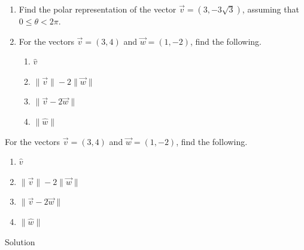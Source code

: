 \begin{example} \label{polarformvecex} 
\ifcourse
\begin{enumerate}
\item  Find the polar representation of the vector $\vec{v} = \left(3, -3\sqrt{3}\right)$, assuming that $0 \leq \theta < 2\pi$.

\item For the vectors $\vec{v} = \left(3,4\right)$ and $\vec{w} = \left(1, -2\right)$, find the following.

\begin{multicols}{4}

\begin{enumerate}

\item  $\hat{v}$

\item  $\| \vec{v} \| -2 \|\vec{w}\|$

\item  $\| \vec{v} -2\vec{w}\|$

\item  $\| \hat{w} \|$ \label{preludetounitvector}

\end{enumerate}

\end{multicols}
\end{enumerate}
\fi

\ifvc
For the vectors $\vec{v} = \left(3,4\right)$ and $\vec{w} = \left(1, -2\right)$, find the following.
	\begin{multicols}{4}	
		\begin{enumerate}
			
			\item  $\hat{v}$
			
			\item  $\| \vec{v} \| -2 \|\vec{w}\|$
			
			\item  $\| \vec{v} -2\vec{w}\|$
			
			\item  $\| \hat{w} \|$ \label{preludetounitvector}
			
		\end{enumerate}	
	\end{multicols}

\fi

\pagebreak
{}Solution 

\ifcourse
\begin{enumerate}


\end{enumerate}
\end{example}
